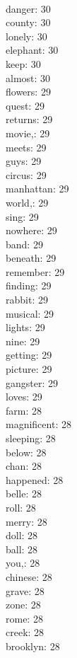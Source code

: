\begin{multicols}{6}
  \\ danger: 30
  \\ county: 30
  \\ lonely: 30
  \\ elephant: 30
  \\ keep: 30
  \\ almost: 30
  \\ flowers: 29
  \\ quest: 29
  \\ returns: 29
  \\ movie,: 29
  \\ meets: 29
  \\ guys: 29
  \\ circus: 29
  \\ manhattan: 29
  \\ world,: 29
  \\ sing: 29
  \\ nowhere: 29
  \\ band: 29
  \\ beneath: 29
  \\ remember: 29
  \\ finding: 29
  \\ rabbit: 29
  \\ musical: 29
  \\ lights: 29
  \\ nine: 29
  \\ getting: 29
  \\ picture: 29
  \\ gangster: 29
  \\ loves: 29
  \\ farm: 28
  \\ magnificent: 28
  \\ sleeping: 28
  \\ below: 28
  \\ chan: 28
  \\ happened: 28
  \\ belle: 28
  \\ roll: 28
  \\ merry: 28
  \\ doll: 28
  \\ ball: 28
  \\ you,: 28
  \\ chinese: 28
  \\ grave: 28
  \\ zone: 28
  \\ rome: 28
  \\ creek: 28
  \\ brooklyn: 28

\end{multicols}
